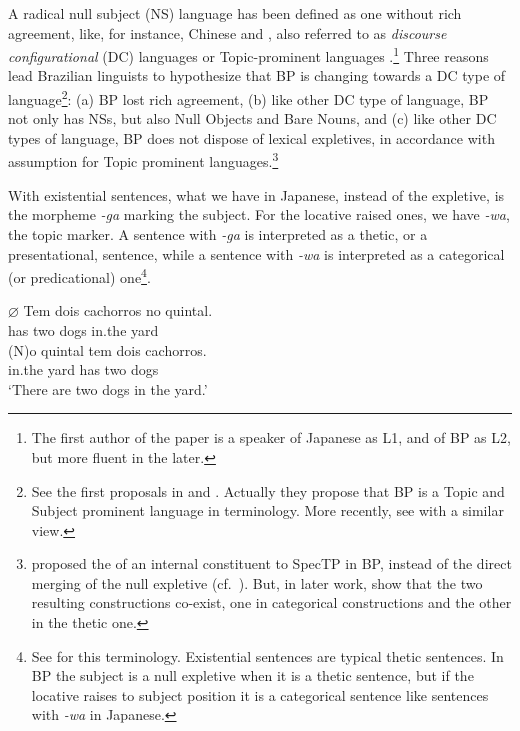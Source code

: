 \documentclass[output=paper]{langsci/langscibook}
\begin{document}
A radical null subject (NS) language has been defined as one without rich
agreement, like, for instance, Chinese and , also referred
to as \emph{discourse configurational} (DC) languages
\parencite{EKiss1995,Miyagawa2010} or Topic-prominent languages
\parencite{LiThompson1976}.\footnote{The first author of the paper is a speaker
of Japanese as L1, and of \gls{BP} as L2, but more
fluent in the later.} Three reasons lead Brazilian linguists to hypothesize
that \gls{BP} is changing towards a DC type of
language\footnote{See the first  proposals in \citet{Pontes1987} and
    \citet{Kato1989}.  Actually they propose that \gls{BP} is a Topic and Subject prominent language in
 terminology.   More recently, see
\citet{NegraoViotti2000,Modesto2008} with a similar view.}: (a)
\gls{BP} lost rich agreement,  (b) like other DC type
of language, \gls{BP} not only has NSs, but also Null
Objects and Bare Nouns, and (c) like other DC types of language,
\gls{BP} does not dispose of lexical expletives, in
accordance with  assumption for Topic prominent
languages.\footnote{\textcite{KatoDuarte2014a} proposed the  of an
    internal constituent to SpecTP in \gls{BP}, instead of the direct merging
    of the null expletive (cf.\ \citealt{Chomsky2004}). But, in later work,
\textcite{KatoDuarte2014b} show that the two resulting constructions co-exist,
one in categorical constructions and the other in the thetic one.}

With existential sentences, what we have in Japanese, instead of the expletive,
is the morpheme  \emph{-ga} marking the subject. For the locative raised ones,
we have \emph{-wa}, the topic marker.  A sentence with \emph{-ga} is
interpreted as a thetic, or a presentational, sentence, while a sentence with
\emph{-wa} is interpreted as a categorical (or predicational) one\footnote{See
    \citet{Kuroda1972} for this terminology.  Existential sentences are typical
    thetic sentences. In \gls{BP} the subject is a
null expletive when it is a thetic sentence, but if the locative raises to
subject position it is a categorical sentence like sentences with \emph{-wa} in
Japanese.}.

\ea%
    \label{ex:key:26.26}
    \ea
    \gll \textbf{$\varnothing$} Tem dois cachorros no quintal.\\
        has two dogs in.the yard\\
    \ex
    \gll (N)o quintal  tem dois cachorros.\\
        in.the yard has two dogs\\
    \glt \enquote*{There are two dogs in the yard.}
    \z
\z
\end{document}
